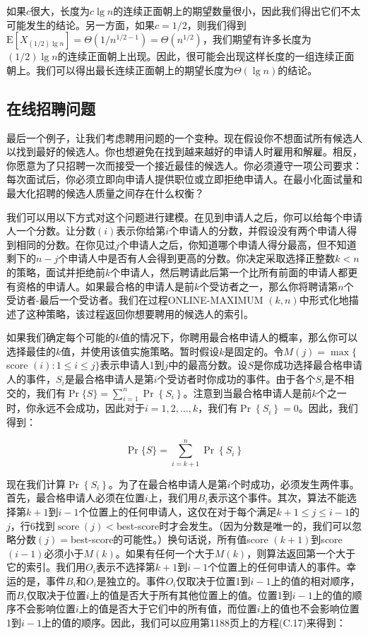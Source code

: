\documentclass[lang=cn,newtx,10pt,scheme=chinese]{elegantbook}
\begin{document}
如果$c$很大，长度为$c\lg n$的连续正面朝上的期望数量很小，因此我们得出它们不太可能发生的结论。另一方面，如果$c=1/2$，则我们得到$\mathrm{E}\left[X_{(1/2)\lg n}\right]=\Theta\left(1/n^{1/2-1}\right)=\Theta\left(n^{1/2}\right)$，我们期望有许多长度为$(1/2)\lg n$的连续正面朝上出现。因此，很可能会出现这样长度的一组连续正面朝上。我们可以得出最长连续正面朝上的期望长度为$\Theta(\lg n)$的结论。

\subsection{在线招聘问题}

最后一个例子，让我们考虑聘用问题的一个变种。现在假设你不想面试所有候选人以找到最好的候选人。你也想避免在找到越来越好的申请人时雇用和解雇。相反，你愿意为了只招聘一次而接受一个接近最佳的候选人。你必须遵守一项公司要求：每次面试后，你必须立即向申请人提供职位或立即拒绝申请人。在最小化面试量和最大化招聘的候选人质量之间存在什么权衡？

我们可以用以下方式对这个问题进行建模。在见到申请人之后，你可以给每个申请人一个分数。让分数$(i)$表示你给第$i$个申请人的分数，并假设没有两个申请人得到相同的分数。在你见过$j$个申请人之后，你知道哪个申请人得分最高，但不知道剩下的$n-j$个申请人中是否有人会得到更高的分数。你决定采取选择正整数$k<n$的策略，面试并拒绝前$k$个申请人，然后聘请此后第一个比所有前面的申请人都更有资格的申请人。如果最合格的申请人是前$k$个受访者之一，那么你将聘请第$n$个受访者-最后一个受访者。我们在过程ONLINE-MAXIMUM $(k, n)$中形式化地描述了这种策略，该过程返回你想要聘用的候选人的索引。

如果我们确定每个可能的$k$值的情况下，你聘用最合格申请人的概率，那么你可以选择最佳的$k$值，并使用该值实施策略。暂时假设$k$是固定的。令$M(j)=\max \{$ score $(i): 1 \leq i \leq j\}$表示申请人1到$j$中的最高分数。设$S$是你成功选择最合格申请人的事件，$S_i$是最合格申请人是第$i$个受访者时你成功的事件。由于各个$S_i$是不相交的，我们有$\operatorname{Pr}\{S\}=\sum_{i=1}^n \operatorname{Pr}\left\{S_i\right\}$。注意到当最合格申请人是前$k$个之一时，你永远不会成功，因此对于$i=1,2, \ldots, k$，我们有$\operatorname{Pr}\left\{S_i\right\}=0$。因此，我们得到：

$$
\operatorname{Pr}\{S\}=\sum_{i=k+1}^n \operatorname{Pr}\left\{S_i\right\}
$$

现在我们计算$\operatorname{Pr}\left\{S_i\right\}$。为了在最合格申请人是第$i$个时成功，必须发生两件事。首先，最合格申请人必须在位置$i$上，我们用$B_i$表示这个事件。其次，算法不能选择第$k+1$到$i-1$个位置上的任何申请人，这仅在对于每个满足$k+1 \leq j \leq i-1$的$j$，行6找到$\operatorname{score}(j)<$best-score时才会发生。（因为分数是唯一的，我们可以忽略分数$(j)=$best-score的可能性。）换句话说，所有值score $(k+1)$到score $(i-1)$必须小于$M(k)$。如果有任何一个大于$M(k)$，则算法返回第一个大于它的索引。我们用$O_i$表示不选择第$k+1$到$i-1$个位置上的任何申请人的事件。幸运的是，事件$B_i$和$O_i$是独立的。事件$O_i$仅取决于位置1到$i-1$上的值的相对顺序，而$B_i$仅取决于位置$i$上的值是否大于所有其他位置上的值。位置1到$i-1$上的值的顺序不会影响位置$i$上的值是否大于它们中的所有值，而位置$i$上的值也不会影响位置1到$i-1$上的值的顺序。因此，我们可以应用第1188页上的方程(C.17)来得到：
\end{document}
